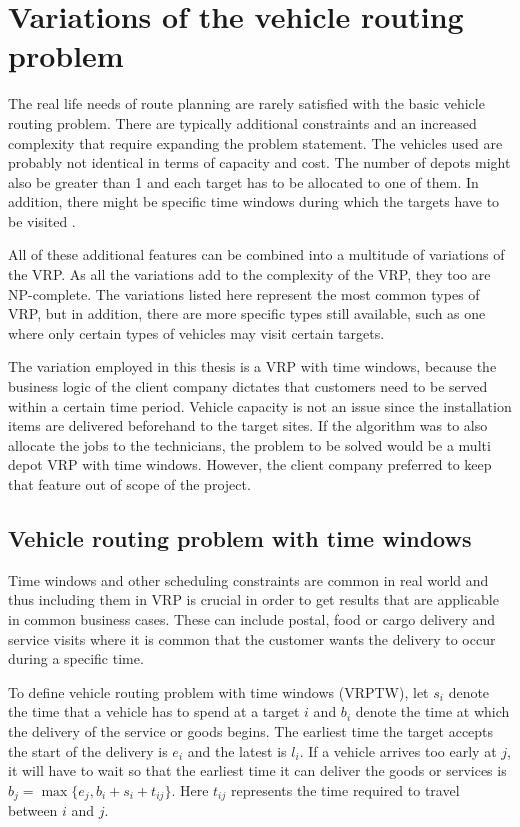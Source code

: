 \section{Variations of the vehicle routing problem}

The real life needs of route planning are rarely satisfied with the basic vehicle routing problem. There are typically additional constraints and an increased complexity that require expanding the problem statement. The vehicles used are probably not identical in terms of capacity and cost. The number of depots might also be greater than 1 and each target has to be allocated to one of them. \cite{salhi2014multi} In addition, there might be specific time windows during which the targets have to be visited \cite{ghoseiri2010multi}. 

All of these additional features can be combined into a multitude of variations of the VRP. As all the variations add to the complexity of the VRP, they too are NP-complete. The variations listed here represent the most common types of VRP, but in addition, there are more specific types still available, such as one where only certain types of vehicles may visit certain targets. \cite{montoya2015literature} 

The variation employed in this thesis is a VRP with time windows, because the business logic of the client company dictates that customers need to be served within a certain time period. Vehicle capacity is not an issue since the installation items are delivered beforehand to the target sites. If the algorithm was to also allocate the jobs to the technicians, the problem to be solved would be a multi depot VRP with time windows. However, the client company preferred to keep that feature out of scope of the project. 


\subsection{Vehicle routing problem with time windows}

Time windows and other scheduling constraints are common in real world and thus including them in VRP is crucial in order to get results that are applicable in common business cases. These can include postal, food or cargo delivery and service visits where it is common that the customer wants the delivery to occur during a specific time. \cite{cordeau2000vrp}

To define vehicle routing problem with time windows (VRPTW), let $s_i$ denote the time that a vehicle has to spend at a target $i$ and $b_i$ denote the time at which the delivery of the service or goods begins. The earliest time the target accepts the start of the delivery is $e_i$ and the latest is $l_i$. If a vehicle arrives too early at $j$, it will have to wait so that the earliest time it can deliver the goods or services is $b_j = \max\{e_j, b_i + s_i + t_{ij}\}$. Here $t_{ij}$ represents the time required to travel between $i$ and $j$. \cite{solomon1987algorithms}


